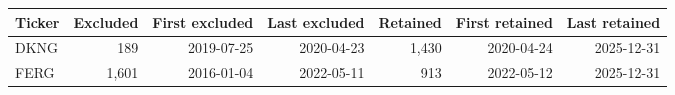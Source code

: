 \begin{tabular}{@{}lrrrrrr@{}}
\toprule
Ticker & Excluded & First excluded & Last excluded & Retained & First retained & Last retained \\
\midrule
DKNG & 189 & 2019-07-25 & 2020-04-23 & 1,430 & 2020-04-24 & 2025-12-31 \\
FERG & 1,601 & 2016-01-04 & 2022-05-11 & 913 & 2022-05-12 & 2025-12-31 \\
\bottomrule
\end{tabular}

